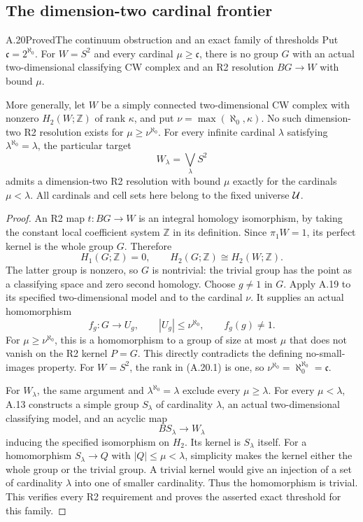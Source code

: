 \subsection{The dimension-two cardinal frontier}

\begin{claim}{A.20}{Proved}{The continuum obstruction and an exact family of thresholds}
Put $\mathfrak c=2^{\aleph_0}$. For $W=S^2$ and every cardinal
$\mu\geq\mathfrak c$, there is no group $G$ with an actual
two-dimensional classifying CW complex and an R2 resolution
$BG\to W$ with bound $\mu$.

More generally, let $W$ be a simply connected two-dimensional CW
complex with nonzero $H_2(W;\mathbb Z)$ of rank $\kappa$, and put
$\nu=\max(\aleph_0,\kappa)$. No such dimension-two R2 resolution
exists for $\mu\geq\nu^{\aleph_0}$.
For every infinite cardinal $\lambda$ satisfying
$\lambda^{\aleph_0}=\lambda$, the particular target
\[
 W_\lambda=\bigvee_{\lambda} S^2
\]
admits a dimension-two R2 resolution with bound $\mu$ exactly
for the cardinals $\mu<\lambda$. All cardinals and cell sets
here belong to the fixed universe $\mathcal U$.
\end{claim}
\begin{proof}
An R2 map $t:BG\to W$ is an integral homology isomorphism, by
taking the constant local coefficient system $\mathbb Z$ in its
definition. Since $\pi_1W=1$, its perfect kernel is the whole
group $G$. Therefore
\[
 H_1(G;\mathbb Z)=0,\qquad
 H_2(G;\mathbb Z)\cong H_2(W;\mathbb Z).
 \tag{A.20.1}
\]
The latter group is nonzero, so $G$ is nontrivial: the trivial
group has the point as a classifying space and zero second
homology. Choose $g\ne1$ in $G$. Apply A.19 to its specified
two-dimensional model and to the cardinal $\nu$. It supplies an
actual homomorphism
\[
 f_g:G\longrightarrow U_g,\qquad
 |U_g|\leq\nu^{\aleph_0},\qquad f_g(g)\ne1.
 \tag{A.20.2}
\]
For $\mu\geq\nu^{\aleph_0}$, this is a homomorphism to a group
of size at most $\mu$ that does not vanish on the R2 kernel
$P=G$. This directly contradicts the defining no-small-images
property. For $W=S^2$, the rank in (A.20.1) is one, so
$\nu^{\aleph_0}=\aleph_0^{\aleph_0}=\mathfrak c$.

For $W_\lambda$, the same argument and
$\lambda^{\aleph_0}=\lambda$ exclude every $\mu\geq\lambda$.
For every $\mu<\lambda$, A.13 constructs a simple group
$S_\lambda$ of cardinality $\lambda$, an actual two-dimensional
classifying model, and an acyclic map
\[
 BS_\lambda\longrightarrow W_\lambda
\]
inducing the specified isomorphism on $H_2$. Its kernel is
$S_\lambda$ itself. For a homomorphism
$S_\lambda\to Q$ with $|Q|\leq\mu<\lambda$, simplicity makes
the kernel either the whole group or the trivial group. A
trivial kernel would give an injection of a set of cardinality
$\lambda$ into one of smaller cardinality. Thus the homomorphism
is trivial. This verifies every R2 requirement and proves the
asserted exact threshold for this family.
\end{proof}

